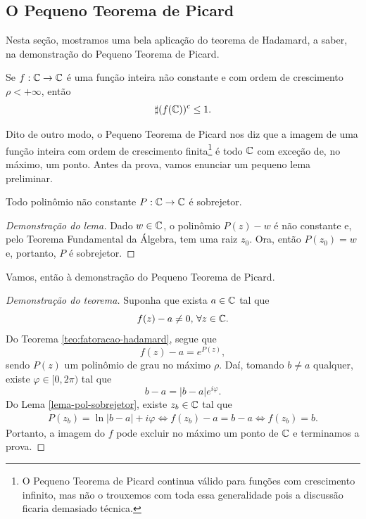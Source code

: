     \subsection{O Pequeno Teorema de Picard}
        Nesta seção, mostramos uma bela aplicação do teorema de Hadamard, a saber, na
        demonstração do Pequeno Teorema de Picard.
        \begin{teorema}
        \label{teo:pequeno-picard}
            Se $f:\mathbb{C}\to\mathbb{C}$ é uma função inteira não constante e com ordem de crescimento $\rho < +\infty$, então
            \[
              \sharp (f(\mathbb{C}))^c \leq 1.
            \]
        \end{teorema}
        Dito de outro modo, o Pequeno Teorema de Picard nos diz que a imagem de uma 
        função inteira com ordem de crescimento finita\footnote{O Pequeno Teorema
        de Picard continua válido para funções com crescimento infinito, mas
        não o trouxemos com toda essa generalidade pois a discussão ficaria demasiado
        técnica.} 
        é todo $\mathbb{C}$ com exceção de,
        no máximo, um ponto. Antes da prova, vamos enunciar um pequeno lema preliminar.
        \begin{lema}
        \label{lema-pol-sobrejetor}
            Todo polinômio não constante $P:\mathbb{C}\to\mathbb{C}$ é sobrejetor.
        \end{lema}
        \begin{proof}[Demonstração do lema]
            Dado $w\in\mathbb{C}$, o polinômio $P(z) - w$ é não constante e, pelo
            Teorema Fundamental da Álgebra, tem uma raiz $z_0$. Ora, então
            $P(z_0) = w$ e, portanto, $P$ é sobrejetor.
        \end{proof}
        
        \medskip
        Vamos, então à demonstração do Pequeno Teorema de Picard.
        \begin{proof}[Demonstração do teorema]
            Suponha que exista $a\in\mathbb{C}$ tal que
            \[
            f(z) - a \neq 0, \, \forall z\in\mathbb{C}.
            \]
            Do Teorema \ref{teo:fatoracao-hadamard}, segue que
            \[
            f(z) - a = e^{P(z)},
            \]
            sendo $P(z)$ um polinômio de grau no máximo $\rho$. Daí, tomando
            $b \neq a$ qualquer, existe $\varphi \in [0, 2\pi)$ tal que
            \[
            b - a = |b - a| e^{i\varphi}.
            \]
            Do Lema \ref{lema-pol-sobrejetor}, existe $z_b\in\mathbb{C}$ tal que
            \begin{align*}
                P(z_b) = \ln|b-a| + i\varphi
                \iff
                f(z_b) - a = b - a
                \iff 
                f(z_b) = b.
            \end{align*}
            Portanto, a imagem do $f$ pode excluir no máximo um ponto de $\mathbb{C}$
            e terminamos a prova.
        \end{proof}
